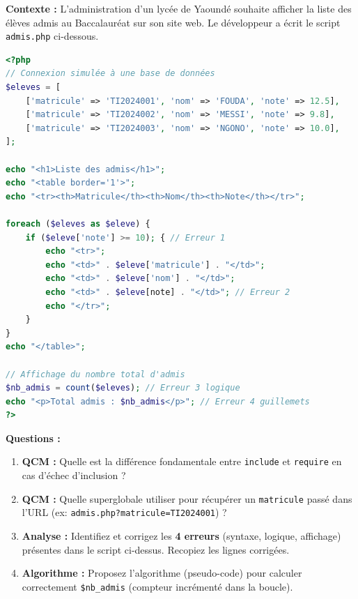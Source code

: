 \documentclass[11pt]{article}
\begin{document}
\begin{exercice}
\textbf{Contexte :} L'administration d'un lycée de Yaoundé souhaite afficher la liste des élèves admis au Baccalauréat sur son site web. Le développeur a écrit le script \texttt{admis.php} ci-dessous.

\begin{lstlisting}[language=Php, caption={Script admis.php (contient des erreurs volontaires)}]
<?php
// Connexion simulée à une base de données
$eleves = [
    ['matricule' => 'TI2024001', 'nom' => 'FOUDA', 'note' => 12.5],
    ['matricule' => 'TI2024002', 'nom' => 'MESSI', 'note' => 9.8],
    ['matricule' => 'TI2024003', 'nom' => 'NGONO', 'note' => 10.0],
];

echo "<h1>Liste des admis</h1>";
echo "<table border='1'>";
echo "<tr><th>Matricule</th><th>Nom</th><th>Note</th></tr>";

foreach ($eleves as $eleve) {
    if ($eleve['note'] >= 10); { // Erreur 1
        echo "<tr>";
        echo "<td>" . $eleve['matricule'] . "</td>";
        echo "<td>" . $eleve['nom'] . "</td>";
        echo "<td>" . $eleve[note] . "</td>"; // Erreur 2
        echo "</tr>";
    }
}
echo "</table>";

// Affichage du nombre total d'admis
$nb_admis = count($eleves); // Erreur 3 logique
echo "<p>Total admis : $nb_admis</p>"; // Erreur 4 guillemets
?>
\end{lstlisting}

\textbf{Questions :}
\begin{enumerate}
    \item \textbf{QCM :} Quelle est la différence fondamentale entre \texttt{include} et \texttt{require} en cas d'échec d'inclusion ?
    \item \textbf{QCM :} Quelle superglobale utiliser pour récupérer un \texttt{matricule} passé dans l'URL (ex: \texttt{admis.php?matricule=TI2024001}) ?
    \item \textbf{Analyse :} Identifiez et corrigez les \textbf{4 erreurs} (syntaxe, logique, affichage) présentes dans le script ci-dessus. Recopiez les lignes corrigées.
    \item \textbf{Algorithme :} Proposez l'algorithme (pseudo-code) pour calculer correctement \texttt{\$nb\_admis} (compteur incrémenté dans la boucle).
\end{enumerate}
\end{exercice}
\end{document}
